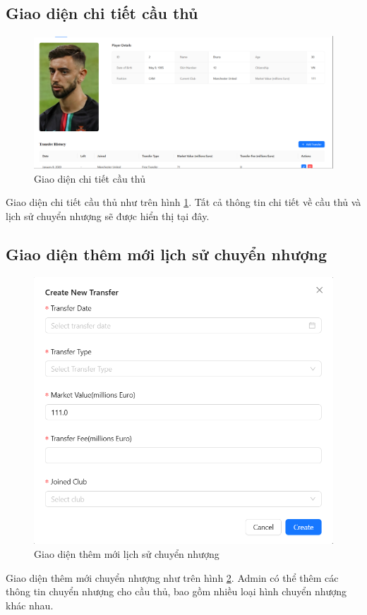 \documentclass[../BTL.tex]{subfiles}
\begin{document}
\subsection{Giao diện chi tiết cầu thủ}
\begin{figure}
    \centering
    \includegraphics[width=1\linewidth]{Hinhve/admin_player_detail.png}
    \caption{Giao diện chi tiết cầu thủ}
    \label{fig:admin_player_detail}
\end{figure}
Giao diện chi tiết cầu thủ như trên hình \ref{fig:admin_player_detail}. Tất cả thông tin chi tiết về cầu thủ và lịch sử chuyển nhượng sẽ được hiển thị tại đây.

\subsection{Giao diện thêm mới lịch sử chuyển nhượng}
\begin{figure}
    \centering
    \includegraphics[width=1\linewidth]{Hinhve/admin_add_transfer.png}
    \caption{Giao diện thêm mới lịch sử chuyển nhượng}
    \label{fig:admin_add_transfer}
\end{figure}
Giao diện thêm mới chuyển nhượng như trên hình \ref{fig:admin_add_transfer}. Admin có thể thêm các thông tin chuyển nhượng cho cầu thủ, bao gồm nhiều loại hình chuyển nhượng khác nhau.
\end{document}
